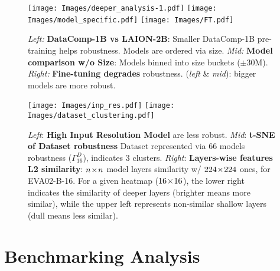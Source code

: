 \begin{figure}[!t]
\centering 
\subfloat
{\texttt{[image: Images/deeper\_analysis-1.pdf]}}
\hfill
\subfloat
{\texttt{[image: Images/model\_specific.pdf]}}
\hfill
\subfloat
{\texttt{[image: Images/FT.pdf]}}
\vspace{-4pt}
\caption{ 
\textit{Left:} \textbf{DataComp-1B vs LAION-2B}: Smaller DataComp-1B pre-training helps robustness. Models are ordered via size.  
\textit{Mid:} \textbf{Model comparison w/o Size}: Models binned into size buckets ($\pm30$M).
\textit{Right:} \textbf{Fine-tuning degrades} robustness.  (\textit{left} \& \textit{mid}): bigger models are more robust.
}
\label{fig:model_size_wise_comparison} 
\label{fig:DC1B_L2B}
\label{fig:deepanalysis}
\vspace{-10pt}
\end{figure}
\begin{figure}[!t]
\centering 
\subfloat
{\texttt{[image: Images/inp\_res.pdf]}}
\hfill
\subfloat
{\texttt{[image: Images/dataset\_clustering.pdf]}}
\hfill
{}
\vspace{-3pt}
\caption{ 
\textit{Left}: \textbf{High Input Resolution Model} are less robust. 
\textit{Mid}: \textbf{t-SNE of Dataset robustness} Dataset represented via 66 models robustness ($\Gamma^{D}_{16}$), indicates 3 clusters. 
\textit{Right}: \textbf{Layers-wise features L2 similarity}: 
$n\!\times\! n$ model layers similarity w/ $224\!\times\!224$ ones, for EVA02-B-16. For a given heatmap (\eg $16\!\times\!16$), the lower right indicates the similarity of deeper layers (brighter means more similar), while the upper left represents non-similar shallow layers (dull means less similar).  
}
\label{fig:feat_heatmap}
\label{fig:deepanalysis2}
\vspace{-11pt}
\end{figure}

\section{Benchmarking Analysis}

